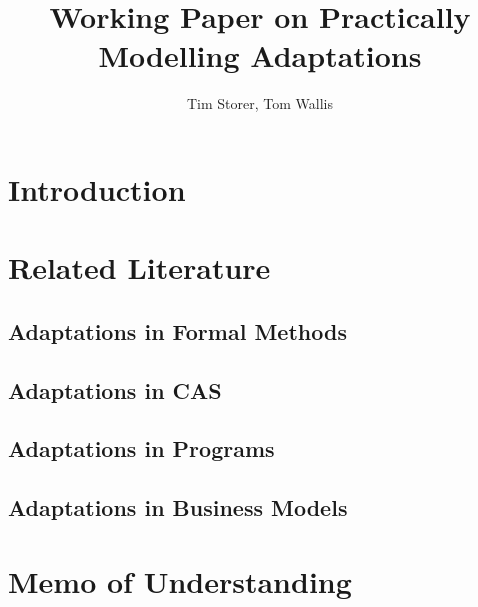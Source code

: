 \documentclass{article}
\title{Working Paper on Practically Modelling Adaptations}
\author{Tim Storer, Tom Wallis}
\begin{document}
\section{Introduction}

\section{Related Literature}

\subsection{Adaptations in Formal Methods}
\subsection{Adaptations in CAS}
\subsection{Adaptations in Programs}
\subsection{Adaptations in Business Models}

\section{Memo of Understanding} %
\end{document}
